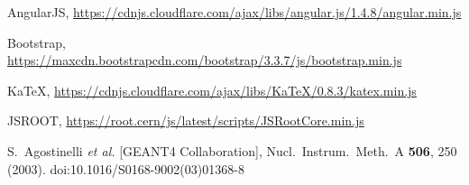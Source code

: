 \begin{thebibliography}{}
%
%
AngularJS, \url{https://cdnjs.cloudflare.com/ajax/libs/angular.js/1.4.8/angular.min.js}

Bootstrap, \url{https://maxcdn.bootstrapcdn.com/bootstrap/3.3.7/js/bootstrap.min.js}

KaTeX, \url{https://cdnjs.cloudflare.com/ajax/libs/KaTeX/0.8.3/katex.min.js}

JSROOT, \url{https://root.cern/js/latest/scripts/JSRootCore.min.js}

S.~Agostinelli {\it et al.} [GEANT4 Collaboration],
  Nucl.\ Instrum.\ Meth.\ A {\bf 506}, 250 (2003).
  doi:10.1016/S0168-9002(03)01368-8


\end{thebibliography}